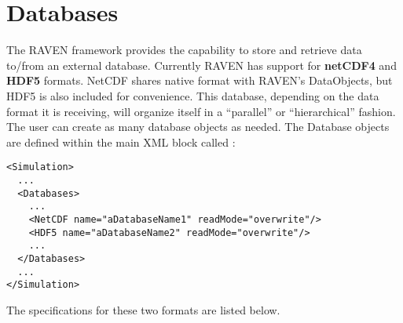 \section{Databases}
\label{sec:Databases}
The RAVEN framework provides the capability to store and retrieve data to/from
an external database.
%
Currently RAVEN has support for \textbf{netCDF4} and \textbf{HDF5} formats.
NetCDF shares native format with RAVEN's DataObjects, but HDF5 is also included for convenience.
%
This database, depending on the data format it is receiving, will organize
itself in a ``parallel'' or ``hierarchical'' fashion.
%
The user can create as many database objects as needed.
%
The Database objects are defined within the main XML block called
:
\begin{lstlisting}[style=XML]
<Simulation>
  ...
  <Databases>
    ...
    <NetCDF name="aDatabaseName1" readMode="overwrite"/>
    <HDF5 name="aDatabaseName2" readMode="overwrite"/>
    ...
  </Databases>
  ...
</Simulation>
\end{lstlisting}
The specifications for these two formats are listed below.

